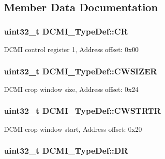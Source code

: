 \subsection{Member Data Documentation}
\hypertarget{struct_d_c_m_i___type_def_a3cfcc9860ca551cbcb10c1c3dd4304f0}{
\subsubsection[{C\-R}]{ uint32\-\_\-t D\-C\-M\-I\-\_\-\-Type\-Def\-::\-C\-R}}\label{struct_d_c_m_i___type_def_a3cfcc9860ca551cbcb10c1c3dd4304f0}
D\-C\-M\-I control register 1, Address offset\-: 0x00 \hypertarget{struct_d_c_m_i___type_def_a1b9c8048339e19b110ecfbea486f55df}{
\subsubsection[{C\-W\-S\-I\-Z\-E\-R}]{ uint32\-\_\-t D\-C\-M\-I\-\_\-\-Type\-Def\-::\-C\-W\-S\-I\-Z\-E\-R}}\label{struct_d_c_m_i___type_def_a1b9c8048339e19b110ecfbea486f55df}
D\-C\-M\-I crop window size, Address offset\-: 0x24 \hypertarget{struct_d_c_m_i___type_def_a4d58830323e567117c12ae3feac613b9}{
\subsubsection[{C\-W\-S\-T\-R\-T\-R}]{ uint32\-\_\-t D\-C\-M\-I\-\_\-\-Type\-Def\-::\-C\-W\-S\-T\-R\-T\-R}}\label{struct_d_c_m_i___type_def_a4d58830323e567117c12ae3feac613b9}
D\-C\-M\-I crop window start, Address offset\-: 0x20 \hypertarget{struct_d_c_m_i___type_def_a266cec1031b0be730b0e35523f5e2934}{
\subsubsection[{D\-R}]{ uint32\-\_\-t D\-C\-M\-I\-\_\-\-Type\-Def\-::\-D\-R}}\label{struct_d_c_m_i___type_def_a266cec1031b0be730b0e35523f5e2934}
